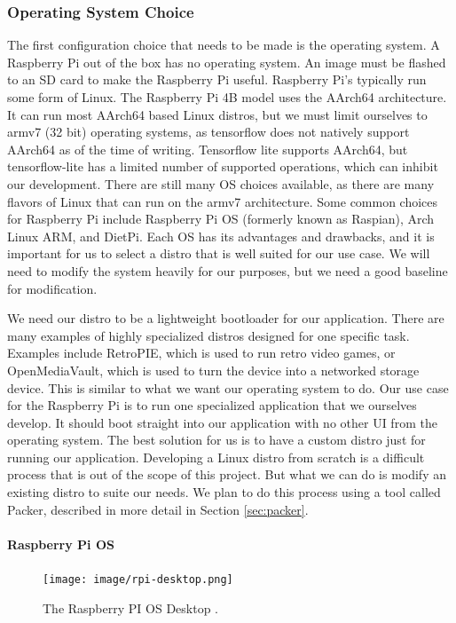 \subsubsection{Operating System Choice}

The first configuration choice that needs to be made is the operating system. A Raspberry
Pi out of the box has no operating system. An image must be flashed to an SD card to make
the Raspberry Pi useful. Raspberry Pi's typically run some form of Linux. The Raspberry Pi
4B model uses the AArch64 architecture. It can run most AArch64 based Linux distros, but
we must limit ourselves to armv7 (32 bit) operating systems, as tensorflow does not
natively support AArch64 as of the time of writing. Tensorflow lite supports AArch64, but
tensorflow-lite has a limited number of supported operations, which can inhibit our
development. There are still many OS choices available, as there are many flavors of Linux
that can run on the armv7 architecture. Some common choices for Raspberry Pi include
Raspberry Pi OS (formerly known as Raspian), Arch Linux ARM, and DietPi. Each OS has its
advantages and drawbacks, and it is important for us to select a distro that is well
suited for our use case. We will need to modify the system heavily for our purposes, but
we need a good baseline for modification.

We need our distro to be a lightweight bootloader for our application. There are many
examples of highly specialized distros designed for one specific task. Examples
include RetroPIE, which is used to run retro video games, or OpenMediaVault, which is used
to turn the device into a networked storage device. This is similar to what we want our
operating system to do. Our use case for the Raspberry Pi is to run one specialized
application that we ourselves develop. It should boot straight into our application with
no other UI from the operating system. The best solution for us is to have a custom distro
just for running our application. Developing a Linux distro from scratch is a difficult
process that is out of the scope of this project. But what we can do is modify an existing
distro to suite our needs. We plan to do this process using a tool called Packer,
described in more detail in Section \ref{sec:packer}.

\paragraph{Raspberry Pi OS}

\begin{figure}[h!]
  \centering
  \texttt{[image: image/rpi-desktop.png]}
  \caption{The Raspberry PI OS Desktop \autocite{rpi-desktop}.}
  \label{fig:rpios}
\end{figure}


